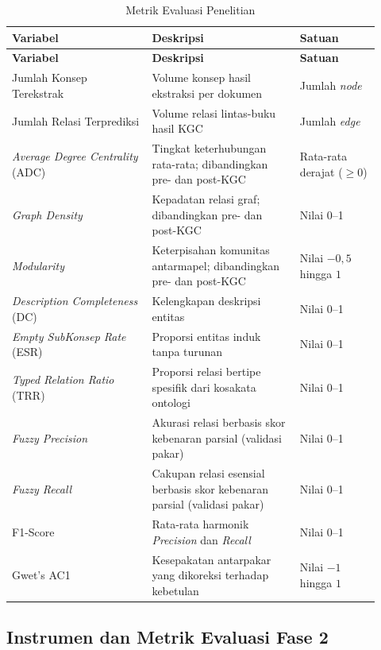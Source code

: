 \documentclass[main]{subfiles}
\begin{document}
\begin{longtable}{@{}p{0.35\linewidth}p{0.37\linewidth}p{0.20\linewidth}@{}}
  \caption{Metrik Evaluasi Penelitian}
  \label{tab:metrik}\\
  \toprule
  \textbf{Variabel} & \textbf{Deskripsi} & \textbf{Satuan} \\
  \midrule
  \endfirsthead
  \toprule
  \textbf{Variabel} & \textbf{Deskripsi} & \textbf{Satuan} \\
  \midrule
  \endhead
  \midrule
  \endfoot
  \bottomrule
  \endlastfoot
  Jumlah Konsep Terekstrak
    & Volume konsep hasil ekstraksi per dokumen
    & Jumlah \textit{node} \\
  Jumlah Relasi Terprediksi
    & Volume relasi lintas-buku hasil KGC
    & Jumlah \textit{edge} \\
  \textit{Average Degree Centrality} (ADC)
    & Tingkat keterhubungan rata-rata; dibandingkan pre- dan post-KGC
    & Rata-rata derajat ($\geq 0$) \\
  \textit{Graph Density}
    & Kepadatan relasi graf; dibandingkan pre- dan post-KGC
    & Nilai 0--1 \\
  \textit{Modularity}
    & Keterpisahan komunitas antarmapel; dibandingkan pre- dan post-KGC
    & Nilai $-0{,}5$ hingga $1$ \\
  \textit{Description Completeness} (DC)
    & Kelengkapan deskripsi entitas
    & Nilai 0--1 \\
  \textit{Empty SubKonsep Rate} (ESR)
    & Proporsi entitas induk tanpa turunan
    & Nilai 0--1 \\
  \textit{Typed Relation Ratio} (TRR)
    & Proporsi relasi bertipe spesifik dari kosakata ontologi
    & Nilai 0--1 \\
  \textit{Fuzzy Precision}
    & Akurasi relasi berbasis skor kebenaran parsial (validasi pakar)
    & Nilai 0--1 \\
  \textit{Fuzzy Recall}
    & Cakupan relasi esensial berbasis skor kebenaran parsial (validasi pakar)
    & Nilai 0--1 \\
  F1-Score
    & Rata-rata harmonik \textit{Precision} dan \textit{Recall}
    & Nilai 0--1 \\
  Gwet's AC1
    & Kesepakatan antarpakar yang dikoreksi terhadap kebetulan
    & Nilai $-1$ hingga $1$ \\
\end{longtable}

\subsection{Instrumen dan Metrik Evaluasi Fase 2}\label{subsec:metrik-fase2}
\end{document}
